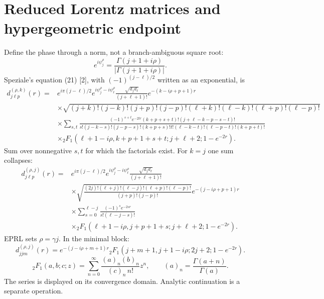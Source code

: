 \documentclass[11pt,a4paper]{article}
\newcommand{\eq}[2]{\begin{equation}#2\tag{#1}\end{equation}}
\begin{document}
\section{Reduced Lorentz matrices and hypergeometric endpoint}
Define the phase through a norm, not a branch-ambiguous square root:
\eq{M1}{e^{i\psi_j^\rho}=\frac{\Gamma(j+1+i\rho)}{|\Gamma(j+1+i\rho)|}.}
Speziale's equation (21) [2], with $(-1)^{(j-\ell)/2}$ written as an exponential, is
\begingroup\small
\eq{M2}{\begin{aligned}
d^{(\rho,k)}_{j\ell p}(r)={}&e^{i\pi(j-\ell)/2}e^{i\psi_j^\rho-i\psi_\ell^\rho}\frac{\sqrt{d_jd_\ell}}{(j+\ell+1)!}e^{-(k-i\rho+p+1)r}\\
&\times\sqrt{(j+k)!(j-k)!(j+p)!(j-p)!(\ell+k)!(\ell-k)!(\ell+p)!(\ell-p)!}\\
&\times\sum_{s,t}\frac{(-1)^{s+t}e^{-2tr}(k+p+s+t)!(j+\ell-k-p-s-t)!}
{s!(j-k-s)!(j-p-s)!(k+p+s)!t!(\ell-k-t)!(\ell-p-t)!(k+p+t)!}\\
&\times{}_2F_1(\ell+1-i\rho,k+p+1+s+t;j+\ell+2;1-e^{-2r}).
\end{aligned}}
\endgroup
Sum over nonnegative $s,t$ for which the factorials exist. For $k=j$ one sum collapses:
\eq{M3}{\begin{aligned}
d^{(\rho,j)}_{j\ell p}(r)={}&e^{i\pi(j-\ell)/2}e^{i\psi_j^\rho-i\psi_\ell^\rho}\frac{\sqrt{d_jd_\ell}}{(j+\ell+1)!}\\
&\times\sqrt{\frac{(2j)!(\ell+j)!(\ell-j)!(\ell+p)!(\ell-p)!}{(j+p)!(j-p)!}}e^{-(j-i\rho+p+1)r}\\
&\times\sum_{s=0}^{\ell-j}\frac{(-1)^se^{-2sr}}{s!(\ell-j-s)!}\\
&\times{}_2F_1(\ell+1-i\rho,j+p+1+s;j+\ell+2;1-e^{-2r}).
\end{aligned}}
EPRL sets $\rho=\gamma j$. In the minimal block:
\eq{M4}{\boxed{d^{(\rho,j)}_{jjm}(r)=e^{-(j-i\rho+m+1)r}{}_2F_1(j+m+1,j+1-i\rho;2j+2;1-e^{-2r}).}}
\eq{M5}{{}_2F_1(a,b;c;z)=\sum_{n=0}^\infty\frac{(a)_n(b)_n}{(c)_n\,n!}z^n,\qquad(a)_n=\frac{\Gamma(a+n)}{\Gamma(a)}.}
The series is displayed on its convergence domain. Analytic continuation is a separate operation.
\end{document}
